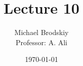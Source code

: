 


\title{Lecture 10}
\date{\today}
\author{Michael Brodskiy\\ \small Professor: A. Ali}



\maketitle

